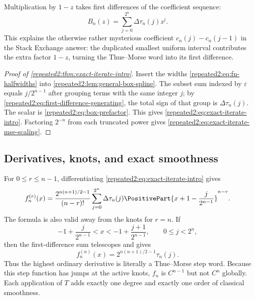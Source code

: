 \documentclass[11pt,oneside]{article}
\theoremstyle{definition}
\theoremstyle{remark}
\begin{document}
Multiplication by $1-z$ takes first differences of the coefficient sequence:
\begin{equation}
 B_n(z)=\sum_{j=0}^{2^n}\Delta\tau_n(j)z^j.
 \label{repeated2:eq:first-difference-generating}
\end{equation}
This explains the otherwise rather mysterious coefficient
$c_n(j)-c_n(j-1)$ in the Stack Exchange answer: the duplicated smallest uniform interval
contributes the extra factor $1-z$, turning the Thue--Morse word into its first difference.

\begin{proof}[Proof of \cref{repeated2:thm:exact-iterate-intro}]
Insert the widths \eqref{repeated2:eq:fn-halfwidths} into \cref{repeated2:lem:general-box-spline}.  The
subset sum indexed by $\varepsilon$ equals $j/2^{n-1}$ after grouping terms with the same
integer $j$; by \eqref{repeated2:eq:first-difference-generating}, the total sign of that group is
$\Delta\tau_n(j)$.  The scalar is \eqref{repeated2:eq:box-prefactor}.  This gives
\eqref{repeated2:eq:exact-iterate-intro}.  Factoring $2^{-n}$ from each truncated power gives
\eqref{repeated2:eq:exact-iterate-mse-scaling}.
\end{proof}

\subsection{Derivatives, knots, and exact smoothness}

For $0\le r\le n-1$, differentiating \eqref{repeated2:eq:exact-iterate-intro} gives
\begin{equation}
 f_n^{(r)}(x)=
 \frac{2^{n(n+1)/2-1}}{(n-r)!}
 \sum_{j=0}^{2^n}\Delta\tau_n(j)
 \PositivePart{x+1-\frac{j}{2^{n-1}}}^{n-r}.
 \label{repeated2:eq:finite-spline-derivatives}
\end{equation}
The formula is also valid away from the knots for $r=n$.  If
\begin{equation}
 -1+\frac{j}{2^{n-1}}<x<-1+\frac{j+1}{2^{n-1}},
 \qquad 0\le j<2^n,
 \label{repeated2:eq:open-cell}
\end{equation}
then the first-difference sum telescopes and gives
\begin{equation}
 \boxed{\displaystyle
 f_n^{(n)}(x)=2^{n(n+1)/2-1}\tau_n(j).}
 \label{repeated2:eq:top-derivative-thue-morse}
\end{equation}
Thus the highest ordinary derivative is literally a Thue--Morse step word.  Because this
step function has jumps at the active knots, $f_n$ is $C^{n-1}$ but not $C^n$ globally.  Each
application of $T$ adds exactly one degree and exactly one order of classical smoothness.
\end{document}
